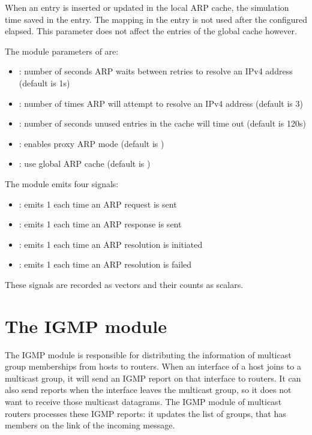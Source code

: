When an entry is inserted or updated in the local ARP cache,
the simulation time saved in the entry. The mapping in the
entry is not used after the configured 
elapsed. This parameter does not affect the entries of
the global cache however.

The module parameters of  are:

\begin{itemize}
  \item {}: number of seconds ARP waits between retries to resolve an IPv4 address (default is 1s)
  \item {}: number of times ARP will attempt to resolve an IPv4 address (default is 3)
  \item {}: number of seconds unused entries in the cache will time out (default is 120s)
  \item {}: enables proxy ARP mode (default is )
  \item {}: use global ARP cache (default is )
\end{itemize}

The  module emits four signals:

\begin{itemize}
  \item {}: emits 1 each time an ARP request is sent
  \item {}: emits 1 each time an ARP response is sent
  \item {}: emits 1 each time an ARP resolution is initiated
  \item {}: emits 1 each time an ARP resolution is failed
\end{itemize}

These signals are recorded as vectors and their counts as scalars.


\section{The IGMP module}

The IGMP module is responsible for distributing the information of
multicast group memberships from hosts to routers. When an interface
of a host joins to a multicast group, it will send an IGMP report
on that interface to routers. It can also send reports when the
interface leaves the multicast group, so it does not want to
receive those multicast datagrams. The IGMP module of multicast
routers processes these IGMP reports: it updates the list of
groups, that has members on the link of the incoming message.


